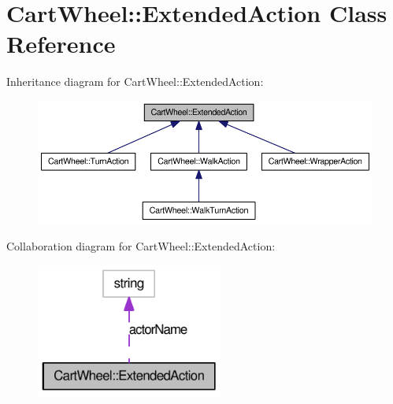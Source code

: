 \hypertarget{classCartWheel_1_1ExtendedAction}{
\section{CartWheel::ExtendedAction Class Reference}
\label{classCartWheel_1_1ExtendedAction}
}


Inheritance diagram for CartWheel::ExtendedAction:\nopagebreak
\begin{figure}[H]
\begin{center}
\leavevmode
\includegraphics[width=400pt]{classCartWheel_1_1ExtendedAction__inherit__graph}
\end{center}
\end{figure}


Collaboration diagram for CartWheel::ExtendedAction:\nopagebreak
\begin{figure}[H]
\begin{center}
\leavevmode
\includegraphics[width=174pt]{classCartWheel_1_1ExtendedAction__coll__graph}
\end{center}
\end{figure}
